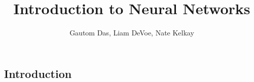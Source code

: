 \documentclass[12pt]{article}
\title{\vspace{-6ex} Introduction to Neural Networks \vspace{-2ex}}
\author{Gautom Das, Liam DeVoe, Nate Kelkay}
\date{}
\begin{document}
\maketitle
\vspace{-7ex}
\subsection*{Introduction}


\newpage
\end{document}
